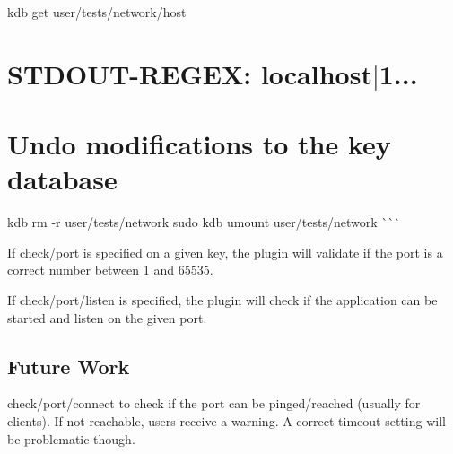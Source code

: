 kdb get user/tests/network/host \hypertarget{autotoc_md484_autotoc_md497}{}\section{S\+T\+D\+O\+U\+T-\/\+R\+E\+G\+E\+X\+: localhost$\vert$1...}\label{autotoc_md484_autotoc_md497}
\hypertarget{autotoc_md484_autotoc_md498}{}\section{Undo modifications to the key database}\label{autotoc_md484_autotoc_md498}
kdb rm -\/r user/tests/network sudo kdb umount user/tests/network \`{}\`{}\`{}

If {\ttfamily check/port} is specified on a given key, the plugin will validate if the port is a correct number between 1 and 65535.

If {\ttfamily check/port/listen} is specified, the plugin will check if the application can be started and listen on the given port.\hypertarget{autotoc_md484_autotoc_md499}{}\subsection{Future Work}\label{autotoc_md484_autotoc_md499}
{\ttfamily check/port/connect} to check if the port can be pinged/reached (usually for clients). If not reachable, users receive a warning. A correct timeout setting will be problematic though. 